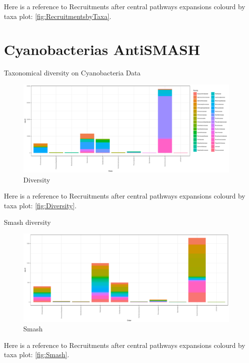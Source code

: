 \documentclass[12pt,twoside]{reedthesis}
\begin{document}
  Here is a reference to Recruitments after central pathways expansions
  colourd by taxa plot: \autoref{fig:RecruitmentsbyTaxa}. \clearpage 
  
  \section{Cyanobacterias AntiSMASH}\label{cyanobacterias-antismash}
  
  Taxonomical diversity on Cyanobacteria Data
  
  \begin{figure}[h!tbp]
  \centering
  \includegraphics[angle = 0,scale = 0.6]{chapter2/Cyanobacteria/Diversity.pdf}
  \caption[Diversity]{\normalsize{Diversity}}
  \label{fig:Diversity}
  \end{figure}
  
  Here is a reference to Recruitments after central pathways expansions
  colourd by taxa plot: \autoref{fig:Diversity}. \clearpage
  
  Smash diversity
  
  \begin{figure}[h!tbp]
  \centering
  \includegraphics[angle = 0,scale = 0.5]{chapter2/Cyanobacteria/Smash.pdf}
  \caption[Smash]{\normalsize{Smash}}
  \label{fig:Smash Taxonomical Diversity}
  \end{figure}
  
  Here is a reference to Recruitments after central pathways expansions
  colourd by taxa plot: \autoref{fig:Smash}. \clearpage
  
\end{document}

